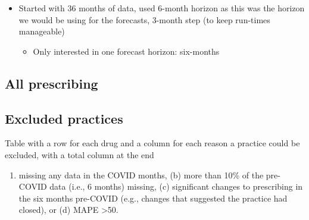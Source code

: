 \begin{appendix}
\begin{itemize}
  \begin{itemize}
  \tightlist
  \item
    Started with 36 months of data, used 6-month horizon as this was the
    horizon we would be using for the forecasts, 3-month step (to keep
    run-times manageable)

    \begin{itemize}
    \tightlist
    \item
      Only interested in one forecast horizon: six-months
    \end{itemize}
  \end{itemize}
\end{itemize}

\hypertarget{all-prescribing}{%
\subsection{All prescribing}\label{all-prescribing}}

\hypertarget{excluded-practices}{%
\subsection{Excluded practices}\label{excluded-practices}}

Table with a row for each drug and a column for each reason a practice
could be excluded, with a total column at the end

\begin{enumerate}
\def\labelenumi{(\alph{enumi})}
\tightlist
\item
  missing any data in the COVID months, (b) more than 10\% of the
  pre-COVID data (i.e., 6 months) missing, (c) significant changes to
  prescribing in the six months pre-COVID (e.g., changes that suggested
  the practice had closed), or (d) MAPE \textgreater50.
\end{enumerate}

\begin{table}


\end{table}
\end{appendix}
